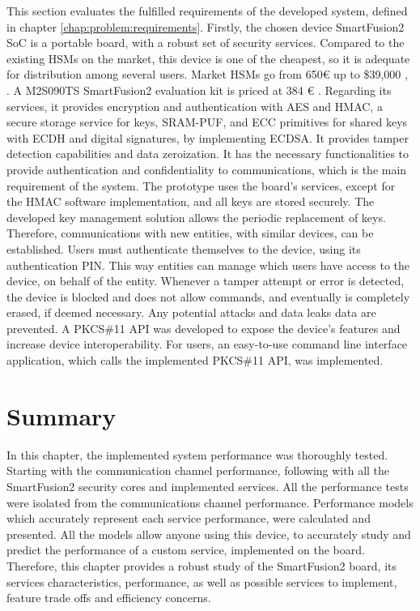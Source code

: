 This section evaluates the fulfilled requirements of the developed system, defined in chapter \ref{chap:problem:requirements}.
Firstly, the chosen device SmartFusion2 SoC is a portable board, with a robust set of security services.
Compared to the existing HSMs on the market, this device is one of the cheapest, so it is adequate for distribution among several users. Market HSMs go from 650€ up to \$39,000 \cite{HSMpriceArticles}, \cite{HSMPresentationPrices}. A M2S090TS SmartFusion2 evaluation kit is priced at 384 € \cite{smartfusionPrice}.
Regarding its services, it provides encryption and authentication with AES and HMAC, a secure storage service for keys, SRAM-PUF, and ECC primitives for shared keys with ECDH and digital signatures, by implementing ECDSA. It provides tamper detection capabilities and data zeroization.
It has the necessary functionalities to provide authentication and confidentiality to communications, which is the main requirement of the system.
The prototype uses the board's services, except for the HMAC software implementation, and all keys are stored securely.
The developed key management solution allows the periodic replacement of keys. Therefore, communications with new entities, with similar devices, can be established.
Users must authenticate themselves to the device, using its authentication PIN. This way entities can manage which users have access to the device, on behalf of the entity.
Whenever a tamper attempt or error is detected, the device is blocked and does not allow commands, and eventually is completely erased, if deemed necessary. Any potential attacks and data leaks data are prevented.
A PKCS\#11 API was developed to expose the device's features and increase device interoperability. For users, an easy-to-use command line interface application, which calls the implemented PKCS\#11 API, was implemented.

\section*{Summary}\label{chap:evaluation:summary}

In this chapter, the implemented system performance was thoroughly tested. Starting with the communication channel performance, following with all the SmartFusion2 security cores and implemented services. All the performance tests were isolated from the communications channel performance. Performance models which accurately represent each service performance, were calculated and presented. All the models allow anyone using this device, to accurately study and predict the performance of a custom service, implemented on the board. Therefore, this chapter provides a robust study of the SmartFusion2 board, its services characteristics, performance, as well as possible services to implement, feature trade offs and efficiency concerns.
